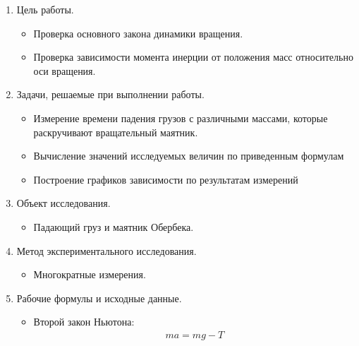 \documentclass[12pt]{article}
\begin{document}
    
    \begin{enumerate}[label=\arabic*)]
        \item Цель работы.
            \begin{itemize}
                \item Проверка основного закона динамики вращения.
                \item Проверка зависимости момента инерции от положения масс относительно оси вращения.
            \end{itemize}
        
        \item Задачи, решаемые при выполнении работы.
            \begin{itemize}
                \item Измерение времени падения грузов с различными массами, которые раскручивают вращательный маятник.
                
                \item Вычисление значений исследуемых величин по приведенным формулам
            
                 \item Построение графиков зависимости по результатам измерений
            \end{itemize}
        
        \item Объект исследования.
            \begin{itemize}
                \item  Падающий груз и маятник Обербека.
            \end{itemize}
          
        
        
        \item Метод экспериментального исследования.
            \begin{itemize}
                \item  Многократные измерения.
            \end{itemize}
        
        \item Рабочие формулы и исходные данные.
        \begin{itemize}
                \item Второй закон Ньютона:
                \begin{gather} 
                ma = mg - T 
                \end{gather}
                

\end{itemize}
\end{enumerate}
\end{document}
